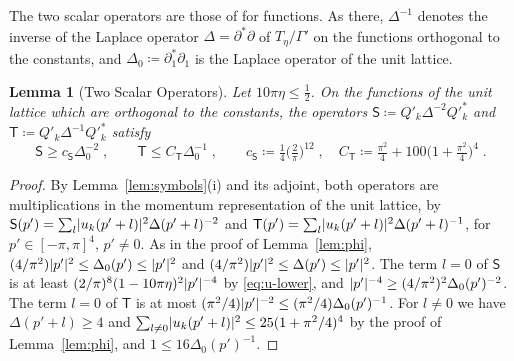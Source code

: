 \documentclass[11pt]{preprint}
\DeclarePairedDelimiter{\abs}{\lvert}{\rvert}
\numberwithin{equation}{section}
\newtheorem{lemma}[theorem]{Lemma}
\theoremstyle{definition}
\theoremstyle{remark}
\theoremstyle{plain}
\begin{document}
The two scalar operators are those of \cite[(1.38), (1.58)]{BalabanPRT1} for functions. As there, $\Delta^{-1}$ denotes the inverse of the Laplace operator $\Delta = \partial^*\partial$ of $T_\eta/\Gamma'$ on the functions orthogonal to the constants, and $\Delta_0 \coloneqq \partial_1^*\partial_1$ is the Laplace operator of the unit lattice.

\begin{lemma}[Two Scalar Operators]\label{lem:scalar-operators}
Let $10\pi\eta \leq \frac12$. On the functions of the unit lattice which are orthogonal to the constants, the operators $\mathsf S \coloneqq Q'_k\Delta^{-2}Q'^*_k$ and $\mathsf T \coloneqq Q'_k\Delta^{-1}Q'^*_k$ satisfy
\begin{equation}\label{eq:scalar-operators}
    \mathsf S \geq c_{\mathsf S}\Delta_0^{-2}\;,
    \qquad
    \mathsf T \leq C_{\mathsf T}\Delta_0^{-1}\;,
    \qquad
    c_{\mathsf S} \coloneqq \tfrac14\bigl(\tfrac{2}{\pi}\bigr)^{12}\;,
    \quad
    C_{\mathsf T} \coloneqq \tfrac{\pi^2}{4} + 100\bigl(1 + \tfrac{\pi^2}{4}\bigr)^4\;.
\end{equation}
\end{lemma}

\begin{proof}
By Lemma~\ref{lem:symbols}(i) and its adjoint, both operators are multiplications in the momentum representation of the unit lattice, by $\mathsf S(p') = \sum_l\abs{u_k(p' + l)}^2\Delta(p' + l)^{-2}$ and $\mathsf T(p') = \sum_l\abs{u_k(p' + l)}^2\Delta(p' + l)^{-1}$, for $p' \in [-\pi, \pi]^4$, $p' \neq 0$. As in the proof of Lemma~\ref{lem:phi}, $(4/\pi^2)\abs{p'}^2 \leq \Delta_0(p') \leq \abs{p'}^2$ and $(4/\pi^2)\abs{p'}^2 \leq \Delta(p') \leq \abs{p'}^2$. The term $l = 0$ of $\mathsf S$ is at least $(2/\pi)^8(1 - 10\pi\eta)^2\abs{p'}^{-4}$ by \eqref{eq:u-lower}, and $\abs{p'}^{-4} \geq (4/\pi^2)^2\Delta_0(p')^{-2}$. The term $l = 0$ of $\mathsf T$ is at most $(\pi^2/4)\abs{p'}^{-2} \leq (\pi^2/4)\Delta_0(p')^{-1}$. For $l \neq 0$ we have $\Delta(p' + l) \geq 4$ and $\sum_{l \neq 0}\abs{u_k(p' + l)}^2 \leq 25(1 + \pi^2/4)^4$ by the proof of Lemma~\ref{lem:phi}, and $1 \leq 16\Delta_0(p')^{-1}$.
\end{proof}
\end{document}
